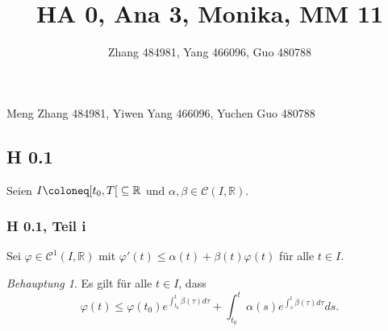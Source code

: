 \documentclass[draft,a5paper]{article}
\title{HA 0, Ana 3, Monika, MM 11}
\author{Zhang 484981, Yang 466096, Guo 480788}
\theoremstyle{remark}
\newtheorem*{Behauptung}{Behauptung}
\begin{document}
\maketitle
\begin{center}
  Meng Zhang 484981, Yiwen Yang 466096, Yuchen Guo 480788
\end{center}

\newpage

\subsection*{H 0.1}
Seien \(I \coloneq \rinterval{t_{0}}{T} \subseteq \mathbb{R}\) und \(\alpha, \beta \in \mathcal{C}(I, \mathbb{R})\).
\subsubsection*{H 0.1, Teil i}
Sei \(\varphi \in \mathcal{C}^{1}(I, \mathbb{R})\) mit \(\varphi'(t) \le \alpha(t) + \beta(t)\varphi(t)\) für alle \(t \in
I\).

\begin{Behauptung}
  Es gilt für alle \(t \in I\), dass
  \[\varphi(t) \le \varphi(t_{0})e^{\int_{t_{0}}^{t}\beta(\tau)d\tau}+\int_{t_{0}}^{t}\alpha(s)e^{\int_{s}^{t}\beta(\tau)d\tau}ds.\]
\end{Behauptung}
\end{document}
